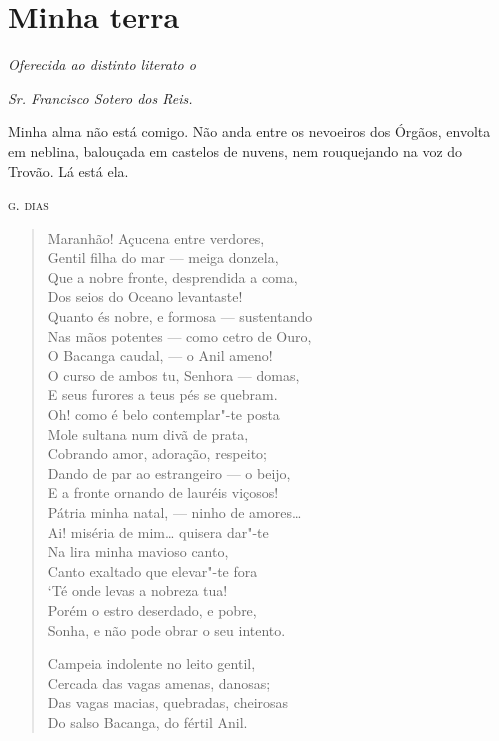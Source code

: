 \chapter{Minha terra}

\hfill{}\emph{Oferecida ao distinto literato o}

\hfill{}\emph{Sr. Francisco Sotero dos Reis.}

\epigraph{Minha alma não está comigo. Não anda entre os nevoeiros dos Órgãos,
envolta em neblina, balouçada em castelos de nuvens, nem rouquejando na
voz do Trovão. Lá está ela.}{\textsc{g. dias}}

\begin{verse}
Maranhão! Açucena entre verdores,\\
Gentil filha do mar --- meiga donzela,\\
Que a nobre fronte, desprendida a coma,\\
Dos seios do Oceano levantaste!\\
Quanto és nobre, e formosa --- sustentando\\
Nas mãos potentes --- como cetro de Ouro,\\
O Bacanga caudal, --- o Anil ameno!\\
O curso de ambos tu, Senhora --- domas,\\
E seus furores a teus pés se quebram.\\
Oh! como é belo contemplar"-te posta\\
Mole sultana num divã de prata,\\
Cobrando amor, adoração, respeito;\\
Dando de par ao estrangeiro --- o beijo,\\
E a fronte ornando de lauréis viçosos!\\
Pátria minha natal, --- ninho de amores\ldots{}\\
Ai! miséria de mim\ldots{} quisera dar"-te\\
Na lira minha mavioso canto,\\
Canto exaltado que elevar"-te fora\\
`Té onde levas a nobreza tua!\\
Porém o estro deserdado, e pobre,\\
Sonha, e não pode obrar o seu intento.

Campeia indolente no leito gentil,\\
Cercada das vagas amenas, danosas;\\
Das vagas macias, quebradas, cheirosas\\
Do salso Bacanga, do fértil Anil.


\end{verse}
